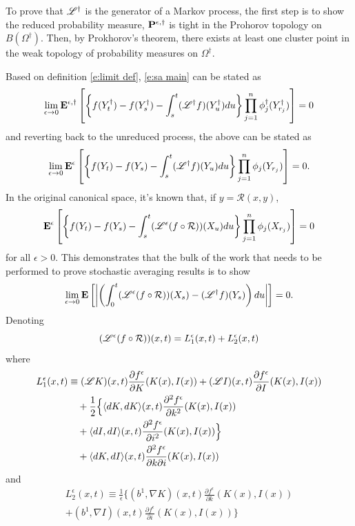 To prove that $\mathscr L^\dagger$ is the generator of a Markov process, the first step is to show the reduced probability measure, $\mathbf P^{\epsilon,\dagger}$ is tight in the Prohorov topology on $B(\Omega^\dagger)$. Then, by Prokhorov's theorem, there exists at least one cluster point in the weak topology of probability measures on $\Omega^\dagger$.

Based on definition \eqref{e:limit def}, \eqref{e:sa main} can be stated as
\[
\lim_{\epsilon \to 0} \operatorname{\mathbf E}^{\epsilon,\dagger} \left[\left\{f(Y_t^\dagger) - f(Y_s^\dagger) - \int_s^t (\mathscr L^\dagger f)(Y_u^\dagger) du\right\} \prod_{j=1}^{n} \phi_j^\dagger(Y_{r_j}^\dagger)\right] = 0
\]
and reverting back to the unreduced process, the above can be stated as
\[
\lim_{\epsilon \to 0} \operatorname{\mathbf E}^\epsilon \left[\left\{f(Y_t) - f(Y_s) - \int_s^t (\mathscr L^\dagger f)(Y_u) du\right\} \prod_{j=1}^{n} \phi_j(Y_{r_j})\right] = 0.
\]
In the original canonical space, it's known that, if $y = \mathcal R(x,y)$,
\[
\operatorname{\mathbf E}^\epsilon \left[\left\{f(Y_t) - f(Y_s) - \int_s^t (\mathscr L^\epsilon (f \circ \mathcal R))(X_u) du\right\} \prod_{j=1}^{n} \phi_j(X_{r_j})\right] = 0
\]
for all $\epsilon > 0$. This demonstrates that the bulk of the work that needs to be performed to prove stochastic averaging results is to show
\[
\lim_{\epsilon \to 0} \operatorname{\mathbf E} \left[\left| \left(\int_0^t (\mathscr L^\epsilon (f \circ \mathcal R))(X_s) - (\mathscr L^\dagger f)(Y_s)\right) du \right|\right] = 0.
\]
Denoting
\[
(\mathscr L^\epsilon (f \circ \mathcal R))(x,t) = L^\epsilon_1(x,t) + L^\epsilon_2(x,t)
\]
where
\[
\begin{aligned}
L^\epsilon_1(x,t) &\equiv (\mathscr L K)(x,t) \frac{\partial f^\epsilon}{\partial K} (K(x),I(x)) + (\mathscr L I)(x,t)\frac{\partial f^\epsilon}{\partial I} (K(x),I(x))\\
&\quad + \frac12 \Big\{\langle dK,dK \rangle(x,t) \frac{\partial^2 f^\epsilon}{\partial k^2} (K(x),I(x))\\
&\quad + \langle dI,dI \rangle(x,t) \frac{\partial^2 f^\epsilon}{\partial i^2} (K(x),I(x))\Big\}\\
&\quad + \langle dK,dI \rangle(x,t) \frac{\partial^2 f^\epsilon}{\partial k \partial i} (K(x),I(x))\\
\end{aligned}
\]
and
\begin{multline*}
L^\epsilon_2(x,t) \equiv \frac{1}{\epsilon} \Big\{( b^1, \nabla K)(x,t)\frac{\partial f^\epsilon}{\partial k}(K(x),I(x))\\
+ (b^1, \nabla I)(x,t)\frac{\partial f^\epsilon}{\partial i}(K(x),I(x))\Big\}
\end{multline*}
